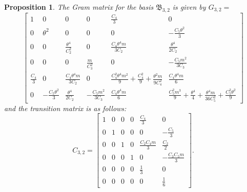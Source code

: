 \documentclass[table]{amsart}
\newtheorem{proposition}[theorem]{Proposition}
\numberwithin{equation}{section}
\begin{document}
\begin{proposition}
   The Gram matrix for the basis $\mathfrak{B}_{3, 2}$ is given by $G_{3,2}=$
    \[
\begin{bmatrix}
1 
& 0 
& 0 
& 0 
& \tfrac{C_4}{3} 
& 0 \\[8pt]

0 
& \theta^2 
& 0 
& 0 
& 0 
& -\tfrac{C_5 \theta^2}{3 } \\[8pt]

0 
& 0 
& \tfrac{\theta^4}{C_2^2} 
& 0 
& \tfrac{ C_4 \theta^4 m}{3 C_2} 
& \tfrac{ \theta^4}{2 C_2} \\[8pt]

0 
& 0 
& 0 
& \tfrac{m}{C_3^2} 
& 0 
& -\tfrac{ C_5 m^2}{3 C_3} \\[6pt]

\tfrac{C_4}{3} 
& 0 
& \tfrac{ C_4 \theta^4 m}{3 C_2} 
& 0 
& \tfrac{ C_4^2 \theta^4 m^2}{9 }
  + \tfrac{C_4^2}{9}
  + \tfrac{\theta^2 m}{9 C_4^2} 
& \tfrac{ C_4 \theta^4 m}{6 } \\[6pt]

0 
& -\tfrac{C_5 \theta^2}{3 } 
& \tfrac{ \theta^4}{2 C_2} 
& -\tfrac{C_5 m^2}{3 C_3} 
& \tfrac{ C_4 \theta^4 m}{6} 
& \tfrac{ C_5^2 m^3}{9 }
  + \tfrac{ \theta^4}{4 }
  + \tfrac{\theta^4 m}{36 C_5^2}
  + \tfrac{C_5^2 \theta^2}{9 }
\end{bmatrix}
\] 
and the transition matrix is as follows:
\[
C_{3,2}=\begin{bmatrix}
1 & 0 & 0 & 0 & \tfrac{C_4}{3} & 0 \\[8pt]
0 & 1 & 0 & 0 & 0 & -\tfrac{C_5}{3} \\[8pt]
0 & 0 & 1 & 0 & \tfrac{C_2 C_4 m}{3} & \tfrac{C_2}{2} \\[8pt]
0 & 0 & 0 & 1 & 0 & -\tfrac{C_3 C_5 m}{3} \\[8pt]
0 & 0 & 0 & 0 & \tfrac{1}{3} & 0 \\[8pt]
0 & 0 & 0 & 0 & 0 & \tfrac{1}{6}
\end{bmatrix}.
\]
\end{proposition}
\end{document}
